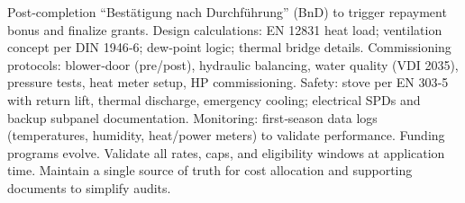 \markdownRendererUlItem Post‑completion “Bestätigung nach Durchführung” (BnD) to trigger repayment bonus and finalize grants.\markdownRendererUlItemEnd 
\markdownRendererUlEndTight \markdownRendererInterblockSeparator
{}
\markdownRendererSectionEnd \markdownRendererSectionBegin
{}\markdownRendererInterblockSeparator
{}\markdownRendererUlBeginTight
\markdownRendererUlItem Design calculations: EN 12831 heat load; ventilation concept per DIN 1946‑6; dew‑point logic; thermal bridge details.\markdownRendererUlItemEnd 
\markdownRendererUlItem Commissioning protocols: blower‑door (pre/post), hydraulic balancing, water quality (VDI 2035), pressure tests, heat meter setup, HP commissioning.\markdownRendererUlItemEnd 
\markdownRendererUlItem Safety: stove per EN 303‑5 with return lift, thermal discharge, emergency cooling; electrical SPDs and backup subpanel documentation.\markdownRendererUlItemEnd 
\markdownRendererUlItem Monitoring: first‑season data logs (temperatures, humidity, heat/power meters) to validate performance.\markdownRendererUlItemEnd 
\markdownRendererUlEndTight \markdownRendererInterblockSeparator
{}
\markdownRendererSectionEnd \markdownRendererSectionBegin
{}\markdownRendererInterblockSeparator
{}\markdownRendererUlBeginTight
\markdownRendererUlItem Funding programs evolve. Validate all rates, caps, and eligibility windows at application time.\markdownRendererUlItemEnd 
\markdownRendererUlItem Maintain a single source of truth for cost allocation and supporting documents to simplify audits.\markdownRendererUlItemEnd 
\markdownRendererUlEndTight 
\markdownRendererSectionEnd 
\markdownRendererSectionEnd \markdownRendererDocumentEnd